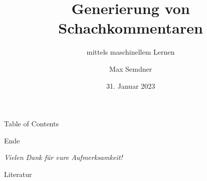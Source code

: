 \documentclass[aspectratio=169,xcolor=dvipsnames,pdf]{beamer}
\title{Generierung von Schachkommentaren}
\subtitle{mittels maschinellem Lernen}
\author{Max Semdner}
\institute{Frankfurt University of Applied Sciences}
\date{31. Januar 2023}
\begin{document}
\begin{frame}
\titlepage
\end{frame}

\begin{frame}{Table of Contents}
\tableofcontents
\end{frame}









\begin{frame}{Ende}
\begin{center}
\begin{large}
\textit{Vielen Dank für eure Aufmerksamkeit!}
\end{large}
\end{center}
\end{frame}

\begin{frame}[allowframebreaks]{Literatur}

\nocite{*}

\end{frame}
\end{document}
